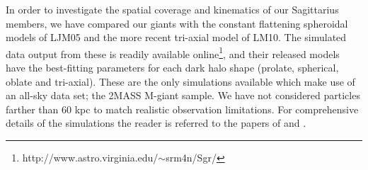 \documentclass[preprint2]{aastex}
\begin{document}
	In order to investigate the spatial coverage and kinematics of our Sagittarius members, we have compared our giants with the constant flattening spheroidal models of LJM05 and the more recent tri-axial model of LM10. The simulated data output from these is readily available online\footnote{http://www.astro.virginia.edu/$\sim$srm4n/Sgr/}, and their released models have the best-fitting parameters for each dark halo shape (prolate, spherical, oblate and tri-axial).  These are the only simulations available which make use of an all-sky data set; the 2MASS M-giant sample. We have not considered particles farther than 60 kpc to match realistic observation limitations. For comprehensive details of the simulations the reader is referred to the papers of \citet{Law;et-al_2005} and \citet{Law;Majewski_2010}. 
		
\end{document}
